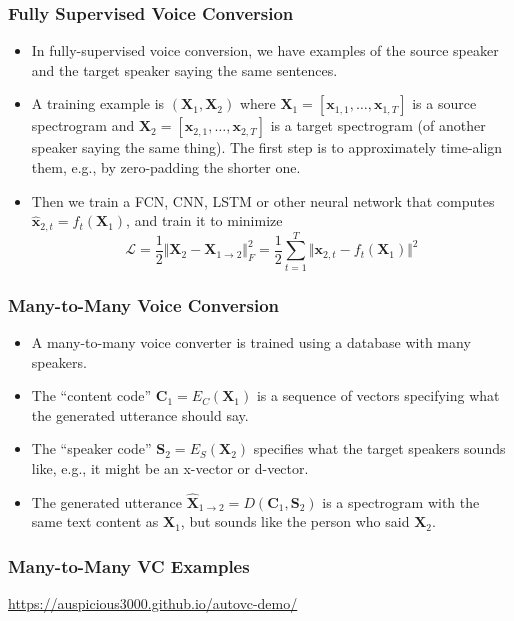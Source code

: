 \documentclass{beamer}
\begin{document}
\begin{frame}
  \frametitle{Fully Supervised Voice Conversion}

  \begin{itemize}
    \item In fully-supervised voice conversion, we have examples of
      the source speaker and the target speaker saying the same sentences.
    \item A training example is $(\bm{X}_1,\bm{X}_2)$ where
      $\bm{X}_1=[\bm{x}_{1,1},\ldots,\bm{x}_{1,T}]$ is a source
      spectrogram and $\bm{X}_2=[\bm{x}_{2,1},\ldots,\bm{x}_{2,T}]$ is
      a target spectrogram (of another speaker saying the same thing).
      The first step is to approximately time-align them, e.g., by
      zero-padding the shorter one.
    \item Then we train a FCN, CNN, LSTM or other neural network that
      computes $\hat{\bm{x}}_{2,t}=f_t(\bm{X}_1)$, and train it to minimize
      \begin{displaymath}
        \mathcal{L}=\frac{1}{2}\Vert\bm{X}_2-\bm{X}_{1\rightarrow{2}}\Vert_F^2=
        \frac{1}{2}\sum_{t=1}^T\Vert\bm{x}_{2,t}-f_t(\bm{X}_1)\Vert^2
      \end{displaymath}
  \end{itemize}
\end{frame}

\begin{frame}
  \frametitle{Many-to-Many Voice Conversion}

  \begin{itemize}
  \item A many-to-many voice converter is trained using a database
    with many speakers.
  \item The ``content code'' $\bm{C}_1=E_C(\bm{X}_1)$ is a sequence of
    vectors specifying what the generated utterance should say.
  \item The ``speaker code'' $\bm{S}_2=E_S(\bm{X}_2)$ specifies what
    the target speakers sounds like, e.g., it might be an x-vector or
    d-vector.
  \item The generated utterance $\hat{\bm{X}}_{1\rightarrow
    2}=D(\bm{C}_1,\bm{S}_2)$ is a spectrogram with the same text
    content as $\bm{X}_1$, but sounds like the person who said $\bm{X}_2$.
  \end{itemize}
\end{frame}

\begin{frame}
  \frametitle{Many-to-Many VC Examples}

  \centerline{\url{https://auspicious3000.github.io/autovc-demo/}}
\end{frame}
\end{document}
